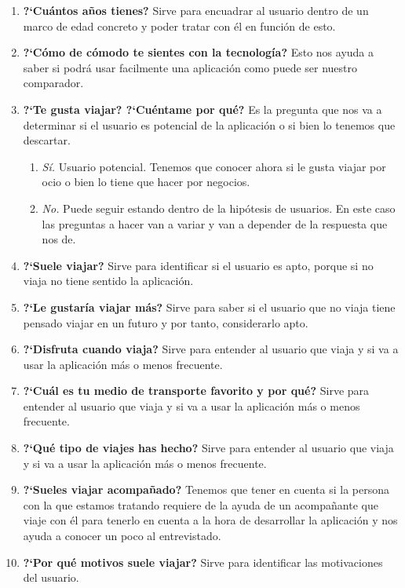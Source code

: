 \begin{enumerate}
    \item {\textbf{?`Cuántos años tienes?}} Sirve para encuadrar al usuario dentro de un marco de edad concreto y poder tratar con él en función de esto.
    \item {\textbf{?`Cómo de cómodo te sientes con la tecnología?}} Esto nos ayuda a saber si podrá usar facilmente una aplicación como puede ser nuestro comparador.
    \item {\textbf{?`Te gusta viajar? ?`Cuéntame por qué?}} Es la pregunta que nos va a determinar si el usuario es potencial de la aplicación
                o si bien lo tenemos que descartar.
    \begin{enumerate}
        \item {\textit{Sí.}} Usuario potencial. Tenemos que conocer ahora si le gusta viajar por ocio o bien lo tiene que hacer por negocios.
        \item {\textit{No.}} Puede seguir estando dentro de la hipótesis de usuarios. En este caso las preguntas a hacer van a variar y van a
                        depender de la respuesta que nos de.
    \end{enumerate}
    \item {\textbf{?`Suele viajar?}} Sirve para identificar si el usuario es apto, porque si no viaja no tiene sentido la aplicación.
    \item {\textbf{?`Le gustaría viajar más?}} Sirve para saber si el usuario que no viaja tiene pensado viajar en un futuro y por tanto, considerarlo apto.
    \item {\textbf{?`Disfruta cuando viaja?}} Sirve para entender al usuario que viaja y si va a usar la aplicación más o menos frecuente.
    \item {\textbf{?`Cuál es tu medio de transporte favorito y por qué?}} Sirve para entender al usuario que viaja y si va a usar la aplicación más o menos frecuente.
    \item {\textbf{?`Qué tipo de viajes has hecho?}} Sirve para entender al usuario que viaja y si va a usar la aplicación más o menos frecuente.
    \item {\textbf{?`Sueles viajar acompañado?}} Tenemos que tener en cuenta si la persona con la que estamos tratando requiere de la
                ayuda de un acompañante que viaje con él para tenerlo en cuenta a la hora de desarrollar la aplicación y nos ayuda a conocer un poco al entrevistado.
    \item {\textbf{?`Por qué motivos suele viajar?}} Sirve para identificar las motivaciones del usuario.

\end{enumerate}
